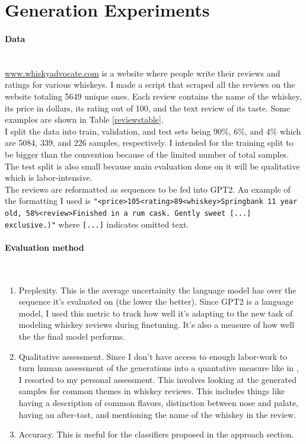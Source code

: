 \documentclass{article}
\begin{document}
\section{Generation Experiments}
\paragraph{Data}$ $
\\ \href{www.whiskyadvocate.com}{www.whiskyadvocate.com} is a website where people write their reviews and ratings for various whiskeys. I made a script that scraped all the reviews on the website totaling 5649 unique ones. Each review contains the name of the whiskey, its price in dollars, its rating out of 100, and the text review of its taste.  Some examples are shown in Table \ref{reviewstable}. 
\\ I split the data into train, validation, and test sets being 90\%, 6\%, and 4\% which are 5084, 339, and 226 samples, respectively. I intended for the training split to be bigger than the convention because of the limited number of total samples. The test split is also small because main evaluation done on it will be qualitative which is labor-intensive. 
\\ The reviews are reformatted as sequences to be fed into GPT2. An example of the formatting I used is \texttt{"<price>105<rating>89<whiskey>Springbank 11 year old, 58\%<review>Finished in a rum cask. Gently sweet [...] exclusive.)"} where \texttt{[...]} indicates omitted text.

\paragraph{Evaluation method}$ $
\begin{enumerate}
\item Preplexity. This is the average uncertainity the language model has over the sequence it's evaluated on (the lower the better). Since GPT2 is a language model, I used this metric to track how well it's adapting to the new task of modeling whiskey reviews during finetuning. It's also a measure of how well the the final model performs.
\item Qualitative assessment. Since I don't have access to enough labor-work to turn human assessment of the generations into a quantative measure like in \cite{adelani2019generating}, I resorted to my personal assessment. This involves looking at the generated samples for common themes in whiskey reviews. This includes things like having a description of common flavors, distinction between nose and palate, having an after-tast, and mentioning the name of the whiskey in the review. 
\item Accuracy. This is useful for the classifiers proposed in the approach section.
\end{enumerate}
\end{document}
